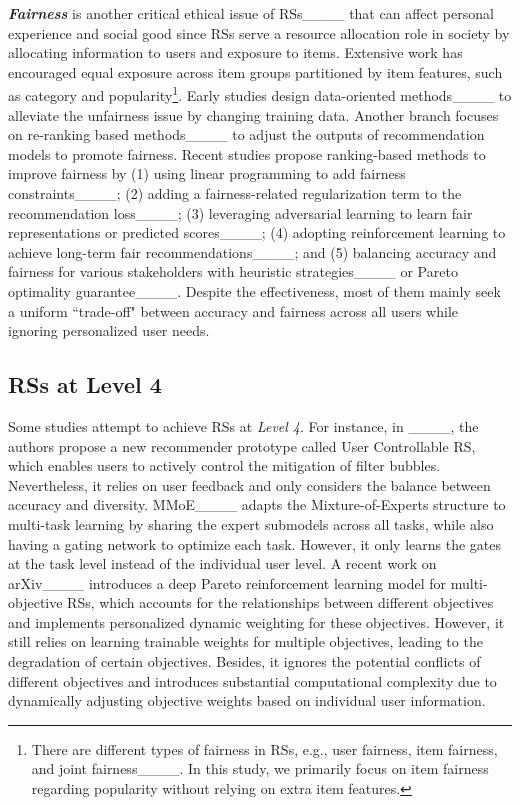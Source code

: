 \smallskip\noindent\textit{\textbf{Fairness}} is another critical ethical issue of RSs____ that can affect personal experience and social good since RSs serve a resource allocation role in society by allocating information to users and exposure to items.
Extensive work has encouraged equal exposure across item groups partitioned by item features, such as category and popularity\footnote{
There are different types of fairness in RSs, e.g., user fairness, item fairness, and joint fairness____. In this study, we primarily focus on item fairness regarding popularity without relying on extra item features.}. 
Early studies design {data-oriented methods}____ to alleviate the unfairness issue by changing training data. 
Another branch focuses on {re-ranking based methods}____ to adjust the outputs of recommendation models to promote fairness. 
Recent studies propose {ranking-based methods} to improve fairness by (1) using linear programming to add fairness constraints____; (2) adding a fairness-related regularization term to the recommendation loss____; 
(3) leveraging adversarial learning to learn fair representations or predicted scores____; (4) adopting reinforcement learning to achieve long-term fair recommendations____; and 
(5) balancing accuracy and fairness for various stakeholders with heuristic strategies____ or Pareto optimality guarantee____. 
Despite the effectiveness, most of them mainly seek a uniform ``trade-off" between accuracy and fairness across all users while ignoring personalized user needs.  

\subsection{RSs at Level 4}
Some studies attempt to achieve RSs at \textit{Level 4}. For instance, in ____, the authors propose a new recommender prototype called User Controllable RS, which enables users to
actively control the mitigation of filter bubbles. Nevertheless, it relies on user feedback and only considers the balance between accuracy and diversity. 
MMoE____ adapts the Mixture-of-Experts structure to multi-task learning by sharing the expert submodels across all tasks, while also having a gating network to optimize each task. However, it only learns the gates at the task level instead of the individual user level. A recent work on arXiv____ introduces a deep Pareto reinforcement learning model for multi-objective RSs, which accounts for the relationships between different objectives and implements personalized dynamic weighting for these objectives. However, it still relies on learning trainable weights for multiple objectives, leading to the degradation of certain objectives. Besides, it ignores the potential conflicts of different objectives and introduces substantial computational complexity due to dynamically adjusting objective weights based on individual user information. 

